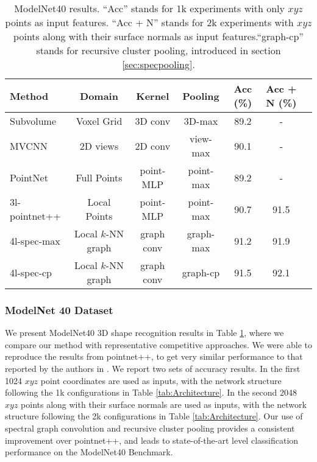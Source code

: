 \documentclass[runningheads]{llncs}
\begin{document}
      
\begin{table}[t]
\renewcommand{\arraystretch}{1.2}
    \centering
        \small
 	\begin{tabular}[width=\linewidth]{l|c|c|c|c|cc}
        \hline
        Method  & Domain & Kernel & Pooling & Acc (\%) & Acc + N (\%) \\
        \hline
Subvolume~\cite{qi2016volumetric} &Voxel Grid & 3D conv & 3D-max  & 89.2  &  - \\
MVCNN~\cite{su2015multi} & 2D views & 2D conv & view-max  & 90.1 &  - \\
        PointNet~\cite{qi2016pointnet} & Full Points& point-MLP &point-max & 89.2 &  -\\ 
        \hline
        \hline
        3l-pointnet++ \cite{qi2017pointnet} & Local Points & point-MLP & point-max  & 90.7 &  91.5\\ 
        4l-spec-max & Local $k$-NN graph & graph conv & graph-max  &  91.2 &  91.9\\
        4l-spec-cp & Local $k$-NN graph & graph conv & graph-cp & 91.5 &  \cellcolor{pink} 92.1\\
        \hline
    \end{tabular}
    
    \vspace{0.2cm}
    \caption{ModelNet40 results. ``Acc'' stands for 1k experiments with only $xyz$ points as input features. ``Acc + N'' stands for 2k experiments with $xyz$ points along with their surface normals as input features.``graph-cp'' stands for recursive cluster pooling, introduced in section \ref{sec:specpooling}.
    }
    \label{tab:modelnet40}
    \vspace{-.5cm}
 \end{table}


\subsubsection{ModelNet 40 Dataset}\label{sec:exp_modelnet}
We present ModelNet40 3D shape recognition results in Table \ref{tab:modelnet40}, where we compare our method with representative competitive approaches. We were able to reproduce the results from pointnet++, to get very similar performance to that reported by the authors in \cite{qi2017pointnet}. We report two sets of accuracy results. In the first 1024 $xyz$ point coordinates are used as inputs, with the network structure following the 1k configurations in Table \ref{tab:Architecture}. In the second 2048 $xyz$ points along with their surface normals are used as inputs, with the network structure following the 2k configurations in Table \ref{tab:Architecture}. Our use of spectral graph convolution and recursive cluster pooling provides a consistent improvement over pointnet++, and leads to state-of-the-art level classification performance on the ModelNet40 Benchmark.
\end{document}
